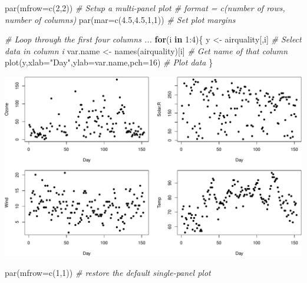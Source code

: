\documentclass[
]{book}
\newenvironment{Shaded}{\begin{snugshade}}{\end{snugshade}}
\newcommand{\AttributeTok}[1]{\textcolor[rgb]{0.77,0.63,0.00}{#1}}
\newcommand{\CommentTok}[1]{\textcolor[rgb]{0.56,0.35,0.01}{\textit{#1}}}
\newcommand{\ControlFlowTok}[1]{\textcolor[rgb]{0.13,0.29,0.53}{\textbf{#1}}}
\newcommand{\DecValTok}[1]{\textcolor[rgb]{0.00,0.00,0.81}{#1}}
\newcommand{\FloatTok}[1]{\textcolor[rgb]{0.00,0.00,0.81}{#1}}
\newcommand{\FunctionTok}[1]{\textcolor[rgb]{0.00,0.00,0.00}{#1}}
\newcommand{\NormalTok}[1]{#1}
\newcommand{\OtherTok}[1]{\textcolor[rgb]{0.56,0.35,0.01}{#1}}
\newcommand{\SpecialCharTok}[1]{\textcolor[rgb]{0.00,0.00,0.00}{#1}}
\newcommand{\StringTok}[1]{\textcolor[rgb]{0.31,0.60,0.02}{#1}}
\begin{document}
\begin{Shaded}
\begin{Highlighting}[]
\FunctionTok{par}\NormalTok{(}\AttributeTok{mfrow=}\FunctionTok{c}\NormalTok{(}\DecValTok{2}\NormalTok{,}\DecValTok{2}\NormalTok{)) }\CommentTok{\# Setup a multi{-}panel plot \# format = c(number of rows, number of columns)}
\FunctionTok{par}\NormalTok{(}\AttributeTok{mar=}\FunctionTok{c}\NormalTok{(}\FloatTok{4.5}\NormalTok{,}\FloatTok{4.5}\NormalTok{,}\DecValTok{1}\NormalTok{,}\DecValTok{1}\NormalTok{)) }\CommentTok{\# Set plot margins}

\CommentTok{\# Loop through the first four columns ...}
\ControlFlowTok{for}\NormalTok{(i }\ControlFlowTok{in} \DecValTok{1}\SpecialCharTok{:}\DecValTok{4}\NormalTok{)\{}
\NormalTok{  y }\OtherTok{\textless{}{-}}\NormalTok{ airquality[,i] }\CommentTok{\# Select data in column i}
\NormalTok{  var.name }\OtherTok{\textless{}{-}} \FunctionTok{names}\NormalTok{(airquality)[i] }\CommentTok{\# Get name of that column}
  \FunctionTok{plot}\NormalTok{(y,}\AttributeTok{xlab=}\StringTok{"Day"}\NormalTok{,}\AttributeTok{ylab=}\NormalTok{var.name,}\AttributeTok{pch=}\DecValTok{16}\NormalTok{) }\CommentTok{\# Plot data}
\NormalTok{\}}
\end{Highlighting}
\end{Shaded}

\includegraphics{figures/unnamed-chunk-306-1.pdf}

\begin{Shaded}
\begin{Highlighting}[]

\FunctionTok{par}\NormalTok{(}\AttributeTok{mfrow=}\FunctionTok{c}\NormalTok{(}\DecValTok{1}\NormalTok{,}\DecValTok{1}\NormalTok{)) }\CommentTok{\# restore the default single{-}panel plot}
\end{Highlighting}
\end{Shaded}
\end{document}
